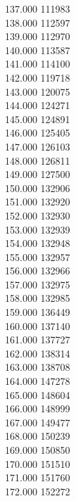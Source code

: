 { 137.000	111983 \\
 138.000	112597 \\
 139.000	112970 \\
 140.000	113587 \\
 141.000	114100 \\
 142.000	119718 \\
 143.000	120075 \\
 144.000	124271 \\
 145.000	124891 \\
 146.000	125405 \\
 147.000	126103 \\
 148.000	126811 \\
 149.000	127500 \\
 150.000	132906 \\
 151.000	132920 \\
 152.000	132930 \\
 153.000	132939 \\
 154.000	132948 \\
 155.000	132957 \\
 156.000	132966 \\
 157.000	132975 \\
 158.000	132985 \\
 159.000	136449 \\
 160.000	137140 \\
 161.000	137727 \\
 162.000	138314 \\
 163.000	138708 \\
 164.000	147278 \\
 165.000	148604 \\
 166.000	148999 \\
 167.000	149477 \\
 168.000	150239 \\
 169.000	150850 \\
 170.000	151510 \\
 171.000	151760 \\
 172.000	152272 \\
}
